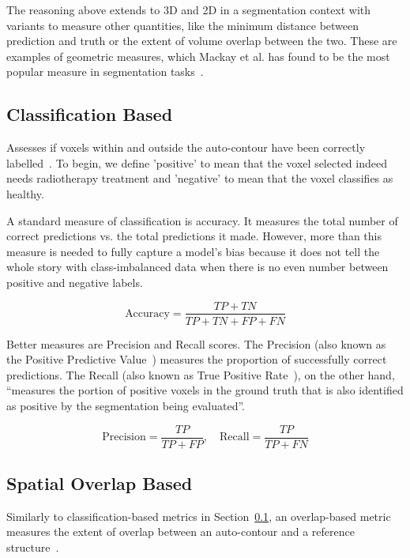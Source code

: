 \documentclass[12pt,twoside]{report}
\begin{document}
The reasoning above extends to 3D and 2D in a segmentation context with variants to measure other quantities, like the minimum distance between prediction and truth or the extent of volume overlap between the two. These are examples of geometric measures, which Mackay et al. has found to be the most popular measure in segmentation tasks~\cite{review-metrics}.

\subsection{Classification Based}\label{sect:classification-based}

Assesses if voxels within and outside the auto-contour have been correctly labelled~\cite{review-metrics}. To begin, we define 'positive' to mean that the voxel selected indeed needs radiotherapy treatment and 'negative' to mean that the voxel classifies as healthy.

A standard measure of classification is accuracy. It measures the total number of correct predictions vs. the total predictions it made. However, more than this measure is needed to fully capture a model's bias because it does not tell the whole story with class-imbalanced data when there is no even number between positive and negative labels.

\begin{equation*}
 \text{Accuracy} = \frac{TP + TN}{TP + TN + FP + FN}
\end{equation*}

Better measures are Precision and Recall scores. The Precision (also known as the Positive Predictive Value~\cite{evaluation-metrics}) measures the proportion of successfully correct predictions. The Recall (also known as True Positive Rate~\cite{evaluation-metrics}), on the other hand, ``measures the portion of positive voxels in the ground truth that is also identified as positive by the segmentation being evaluated''.

\begin{equation*}
 \text{Precision} = \frac{TP}{TP+FP}, \quad \text{Recall} = \frac{TP}{TP+FN}
\end{equation*}

\subsection{Spatial Overlap Based}\label{sect:spatial-overlap-based}

Similarly to classification-based metrics in Section~\ref{sect:classification-based}, an overlap-based metric measures the extent of overlap between an auto-contour and a reference structure~\cite{review-metrics}.
\end{document}
